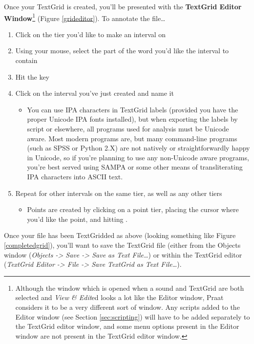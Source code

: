 Once your TextGrid is created, you'll be presented with the
\textbf{TextGrid Editor
Window}\footnote{Although the window which is opened when a sound and TextGrid are both selected and \textit{View \& Edit}ed looks a lot like the Editor window, Praat considers it to be a very different sort of window.  Any scripts added to the Editor window (see Section \ref{sec:scripting}) will have to be added separately to the TextGrid editor window, and some menu options present in the Editor window are not present in the TextGrid editor window.}
(Figure \ref{grideditor}). To annotate the file\ldots{}

\begin{enumerate}
\def\labelenumi{\arabic{enumi}.}
\setcounter{enumi}{4}
\tightlist
\item
  Click on the tier you'd like to make an interval on
\item
  Using your mouse, select the part of the word you'd like the interval
  to contain
\item
  Hit the key
\item
  Click on the interval you've just created and name it

  \begin{itemize}
  \tightlist
  \item
    You can use IPA characters in TextGrid labels (provided you have the
    proper Unicode IPA fonts installed), but when exporting the labels
    by script or elsewhere, all programs used for analysis must be
    Unicode aware. Most modern programs are, but many command-line
    programs (such as SPSS or Python 2.X) are not natively or
    straightforwardly happy in Unicode, so if you're planning to use any
    non-Unicode aware programs, you're best served using SAMPA or some
    other means of transliterating IPA characters into ASCII text.
  \end{itemize}
\item
  Repeat for other intervals on the same tier, as well as any other
  tiers

  \begin{itemize}
  \tightlist
  \item
    Points are created by clicking on a point tier, placing the cursor
    where you'd like the point, and hitting .
  \end{itemize}
\end{enumerate}

Once your file has been TextGridded as above (looking something like
Figure \ref{completedgrid}), you'll want to save the TextGrid file
(either from the Objects window (\emph{Objects -\textgreater{} Save
-\textgreater{} Save as Text File\ldots{}}) or within the TextGrid
editor (\emph{TextGrid Editor -\textgreater{} File -\textgreater{} Save
TextGrid as Text File\ldots{}}).

